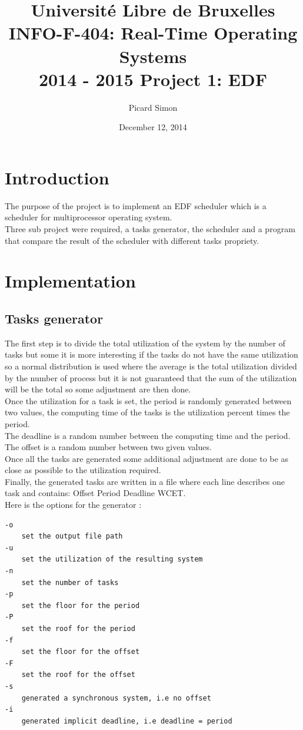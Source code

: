\documentclass[a4paper,12pt]{article}
\title{Université Libre de Bruxelles\\
INFO-F-404: Real-Time Operating Systems\\
2014 - 2015 Project 1: EDF}
\author{Picard Simon}
\date{December 12, 2014}
\begin{document}
\maketitle
\clearpage
\tableofcontents
\clearpage

\section{Introduction}
The purpose of the project is to implement an EDF scheduler which is a scheduler for multiprocessor operating system.\\
Three sub project were required, a tasks generator, the scheduler and a program that compare the result of the scheduler with different tasks propriety.

\section{Implementation}
\subsection{Tasks generator}
The first step is to divide the total utilization of the system by the number of tasks but some it is more interesting if the tasks do not have the same utilization so a normal distribution is used where the average is the total utilization divided by the number of process but it is not guaranteed that the sum of the utilization will be the total so some adjustment are then done.\\
Once the utilization for a task is set, the period is randomly generated between two values, the computing time of the tasks is the utilization percent times the period.\\
The deadline is a random number between the computing time and the period.\\
The offset is a random number between two given values.\\
Once all the tasks are generated some additional adjustment are done to be as close as possible to the utilization required.\\
Finally, the generated tasks are written in a file where each line describes one task and contains: Offset Period Deadline WCET.\\
Here is the options for the generator :
\begin{verbatim}
-o
    set the output file path
-u
    set the utilization of the resulting system
-n
    set the number of tasks
-p
    set the floor for the period
-P
    set the roof for the period
-f
    set the floor for the offset
-F
    set the roof for the offset
-s
    generated a synchronous system, i.e no offset
-i
    generated implicit deadline, i.e deadline = period
\end{verbatim}
\end{document}
